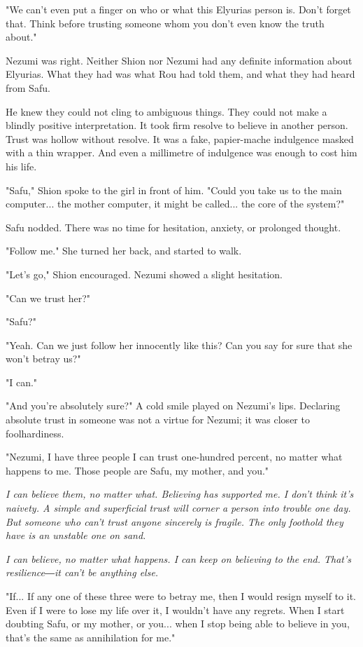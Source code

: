 "We can't even put a finger on who or what this Elyurias person is.
Don't forget that. Think before trusting someone whom you don't even
know the truth about."

Nezumi was right. Neither Shion nor Nezumi had any definite information
about Elyurias. What they had was what Rou had told them, and what they
had heard from Safu.

He knew they could not cling to ambiguous things. They could not make a
blindly positive interpretation. It took firm resolve to believe in
another person. Trust was hollow without resolve. It was a fake,
papier-mache indulgence masked with a thin wrapper. And even a
millimetre of indulgence was enough to cost him his life.

"Safu," Shion spoke to the girl in front of him. "Could you take us to
the main computer... the mother computer, it might be called... the core
of the system?"

Safu nodded. There was no time for hesitation, anxiety, or prolonged
thought.

"Follow me." She turned her back, and started to walk.

"Let's go," Shion encouraged. Nezumi showed a slight hesitation.

"Can we trust her?"

"Safu?"

"Yeah. Can we just follow her innocently like this? Can you say for sure
that she won't betray us?"

"I can."

"And you're absolutely sure?" A cold smile played on Nezumi's lips.
Declaring absolute trust in someone was not a virtue for Nezumi; it was
closer to foolhardiness.

"Nezumi, I have three people I can trust one-hundred percent, no matter
what happens to me. Those people are Safu, my mother, and you."

\emph{I can believe them, no matter what. Believing has supported me. I don't
	think it's naivety. A simple and superficial trust will corner a person
	into trouble one day. But someone who can't trust anyone sincerely is
	fragile. The only foothold they have is an unstable one on sand.}

\emph{I can believe, no matter what happens. I can keep on believing to the
	end. That's resilience―it can't be anything else.}

"If... If any one of these three were to betray me, then I would resign
myself to it. Even if I were to lose my life over it, I wouldn't have
any regrets. When I start doubting Safu, or my mother, or you... when I
stop being able to believe in you, that's the same as annihilation for
me."

